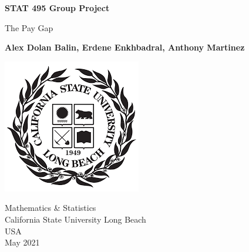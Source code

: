 \begin{titlepage}
   \begin{center}
       \vspace*{1cm}

       \textbf{STAT 495 Group Project}

       \vspace{0.5cm}
        The Pay Gap
            
       \vspace{1cm}

       \textbf{Alex Dolan Balin, Erdene Enkhbadral, Anthony Martinez}

       \vfill
        
            

     
       \includegraphics{university.png}
       
              \vspace{1.5cm}
            
       Mathematics \& Statistics\\
       California State University Long Beach\\
       USA\\
       May 2021
            
   \end{center}
\end{titlepage}